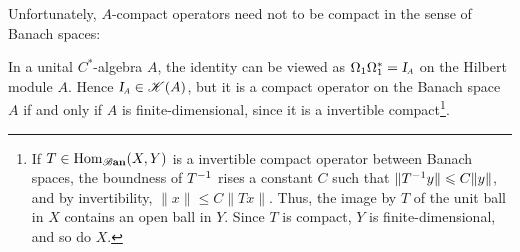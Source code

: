 Unfortunately, $A$-compact operators need not to be compact in the sense of Banach spaces:

\begin{contraexemplo}
In a unital $C^*$-algebra $A$, the identity can be viewed as $\Omega_1 \Omega_1^* = \sub \Id A$ on the Hilbert module $A$. Hence $\sub \Id A \in \mathscr K(A)$, but it is a compact operator on the Banach space $A$ if and only if $A$ is finite-dimensional, since it is a invertible compact\footnote{If $T \in \operatorname{Hom}_{\boldsymbol{\mathscr B}\textbf{an}}(X,Y)$ is a invertible compact operator between Banach spaces, the boundness of ${T}^{-1}$ rises a constant $C$ such that $\|{T}^{-1}y\| \leqslant C\|y\|$, and by invertibility, $\|x\|\leqslant C\|Tx\|$. Thus, the image by $T$ of the unit ball in $X$ contains an open ball in $Y$. Since $T$ is compact, $Y$ is
finite-dimensional, and so do $X$.}. 
\end{contraexemplo}


